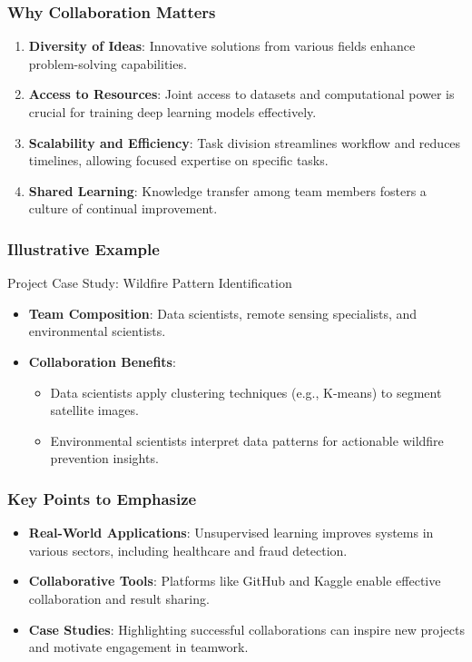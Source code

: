 \documentclass[aspectratio=169]{beamer}
\begin{document}
\begin{frame}[fragile]
    \frametitle{Why Collaboration Matters}
    \begin{enumerate}
        \item \textbf{Diversity of Ideas}: 
            Innovative solutions from various fields enhance problem-solving capabilities.
        \item \textbf{Access to Resources}: 
            Joint access to datasets and computational power is crucial for training deep learning models effectively.
        \item \textbf{Scalability and Efficiency}: 
            Task division streamlines workflow and reduces timelines, allowing focused expertise on specific tasks.
        \item \textbf{Shared Learning}: 
            Knowledge transfer among team members fosters a culture of continual improvement.
    \end{enumerate}
\end{frame}

\begin{frame}[fragile]
    \frametitle{Illustrative Example}
    \begin{block}{Project Case Study: Wildfire Pattern Identification}
        \begin{itemize}
            \item \textbf{Team Composition}: 
                Data scientists, remote sensing specialists, and environmental scientists.
            \item \textbf{Collaboration Benefits}:
                \begin{itemize}
                    \item Data scientists apply clustering techniques (e.g., K-means) to segment satellite images.
                    \item Environmental scientists interpret data patterns for actionable wildfire prevention insights.
                \end{itemize}
        \end{itemize}
    \end{block}
\end{frame}

\begin{frame}[fragile]
    \frametitle{Key Points to Emphasize}
    \begin{itemize}
        \item \textbf{Real-World Applications}: Unsupervised learning improves systems in various sectors, including healthcare and fraud detection.
        \item \textbf{Collaborative Tools}: Platforms like GitHub and Kaggle enable effective collaboration and result sharing.
        \item \textbf{Case Studies}: Highlighting successful collaborations can inspire new projects and motivate engagement in teamwork.
    \end{itemize}
\end{frame}
\end{document}
